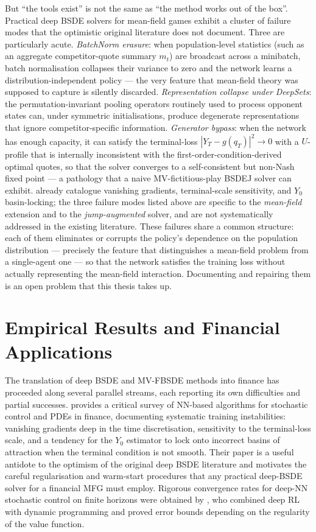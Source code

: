 But ``the tools exist'' is not the same as ``the method works
out of the box''.  Practical deep BSDE solvers for mean-field games
exhibit a cluster of failure modes that the optimistic original
literature does not document.  Three are particularly acute.
\emph{BatchNorm erasure}: when population-level statistics (such as
an aggregate competitor-quote summary $m_t$) are broadcast across a
minibatch, batch normalisation collapses their variance to zero and
the network learns a distribution-independent policy — the very
feature that mean-field theory was supposed to capture is silently
discarded.  \emph{Representation collapse under DeepSets}: the
permutation-invariant pooling operators routinely used to process
opponent states can, under symmetric initialisations, produce
degenerate representations that ignore competitor-specific
information.  \emph{Generator bypass}: when the network has enough
capacity, it can satisfy the terminal-loss
$|Y_T - g(q_T)|^2 \to 0$ with a $U$-profile that is internally
inconsistent with the first-order-condition-derived optimal quotes,
so that the solver converges to a self-consistent but non-Nash
fixed point — a pathology that a naive MV-fictitious-play BSDEJ
solver can exhibit.  \citet{germain2022} already catalogue
vanishing gradients, terminal-scale sensitivity, and $Y_0$
basin-locking; the three failure modes listed above are specific
to the \emph{mean-field} extension and to the
\emph{jump-augmented} solver, and are not systematically
addressed in the existing literature.  These failures share a
common structure: each of them eliminates or corrupts the
policy's dependence on the population distribution --- precisely
the feature that distinguishes a mean-field problem from a
single-agent one --- so that the network satisfies the training
loss without actually representing the mean-field interaction.
Documenting and repairing them is an open problem that this
thesis takes up.

\section{Empirical Results and Financial Applications}\label{sec:lit-empirical}

The translation of deep BSDE and MV-FBSDE methods into finance has
proceeded along several parallel streams, each reporting its own
difficulties and partial successes.
\citet{germain2022} provides a critical survey of NN-based
algorithms for stochastic control and PDEs in finance, documenting
systematic training instabilities: vanishing gradients deep in the
time discretisation, sensitivity to the terminal-loss scale, and a
tendency for the $Y_0$ estimator to lock onto incorrect basins of
attraction when the terminal condition is not smooth.  Their paper
is a useful antidote to the optimism of the original deep BSDE
literature and motivates the careful regularisation and
warm-start procedures that any practical deep-BSDE solver for a
financial MFG must employ.  Rigorous convergence rates
for deep-NN stochastic control on finite horizons were obtained by
\citet{hure2020}, who combined deep RL with dynamic
programming and proved error bounds depending on the regularity of
the value function.

